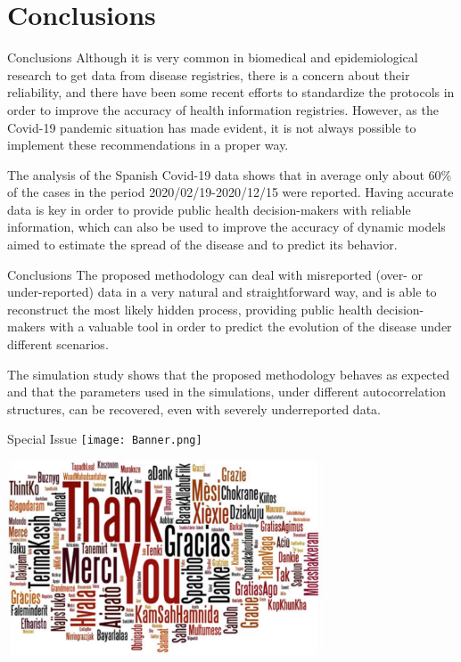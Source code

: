 \documentclass[
    10pt,
    aspectratio=169,
    usenames,
    dvipsnames
]{beamer}
\begin{document}
\section{Conclusions}

\begin{frame}{Conclusions}
Although it is very common in biomedical and epidemiological research to get data from disease registries, there is a concern about their reliability, and there have been some recent efforts to standardize the protocols in order to improve the accuracy of health information registries. However, as the Covid-19 pandemic situation has made evident, it is not always possible to implement these recommendations in a proper way.  

The analysis of the Spanish Covid-19 data shows that in average only about 60\% of the cases in the period 2020/02/19-2020/12/15 were reported. Having accurate data is key in order to provide public health decision-makers with reliable information, which can also be used to improve the accuracy of dynamic models aimed to estimate the spread of the disease and to predict its behavior. 
\end{frame}

\begin{frame}{Conclusions}
The proposed methodology can deal with misreported (over- or under-reported) data in a very natural and straightforward way, and is able to reconstruct the most likely hidden process, providing public health decision-makers with a valuable tool in order to predict the evolution of the disease under different scenarios. 

The simulation study shows that the proposed methodology behaves as expected and that the parameters used in the simulations, under different autocorrelation structures, can be recovered, even with severely underreported data.
\end{frame}

\begin{frame}[fragile]{Special Issue}
\centering
\texttt{[image: Banner.png]}
\end{frame}

\begin{frame}[plain]
\centering
\includegraphics[width=0.7\textwidth ]{thanks.pdf}
\end{frame}
\end{document}
